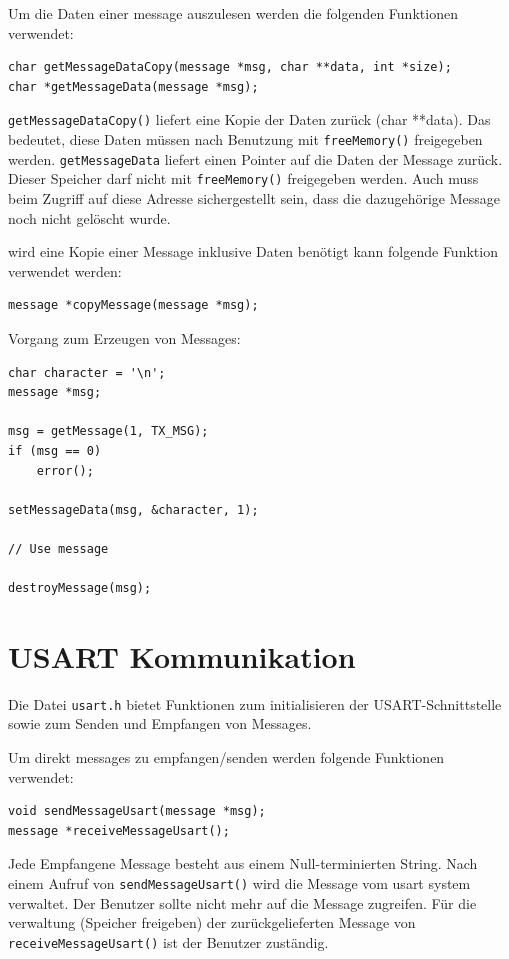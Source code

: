 \documentclass[fontsize=12pt, toc=bibliography, notitlepage]{scrreprt}
\begin{document}
Um die Daten einer message auszulesen werden die folgenden Funktionen verwendet:

\begin{lstlisting}
char getMessageDataCopy(message *msg, char **data, int *size);
char *getMessageData(message *msg);
\end{lstlisting}

\lstinline$getMessageDataCopy()$ liefert eine Kopie der Daten zurück (char **data). Das bedeutet, diese Daten müssen nach Benutzung mit \lstinline$freeMemory()$  freigegeben werden. \lstinline$getMessageData$ liefert einen Pointer auf die Daten der Message zurück. Dieser Speicher darf nicht mit \lstinline$freeMemory()$  freigegeben werden. Auch muss beim Zugriff auf diese Adresse sichergestellt sein, dass die dazugehörige Message noch nicht gelöscht wurde.

wird eine Kopie einer Message inklusive Daten benötigt kann folgende Funktion verwendet werden:

\begin{lstlisting}
message *copyMessage(message *msg);
\end{lstlisting}

Vorgang zum Erzeugen von Messages:

\begin{lstlisting}
char character = '\n';
message *msg;

msg = getMessage(1, TX_MSG);
if (msg == 0)
	error();
	
setMessageData(msg, &character, 1);

// Use message

destroyMessage(msg);
\end{lstlisting}

\section{USART Kommunikation}
\label{subsec:shell-communication}
Die Datei \lstinline$usart.h$ bietet Funktionen zum initialisieren der USART-Schnittstelle sowie zum Senden und Empfangen von Messages.

Um direkt messages zu empfangen/senden werden folgende Funktionen verwendet:

\begin{lstlisting}
void sendMessageUsart(message *msg);
message *receiveMessageUsart();
\end{lstlisting}

Jede Empfangene Message besteht aus einem Null-terminierten String. Nach einem Aufruf von \lstinline$sendMessageUsart()$ wird die Message vom usart system verwaltet. Der Benutzer sollte nicht mehr auf die Message zugreifen. Für die verwaltung (Speicher freigeben) der zurückgelieferten Message von \lstinline$receiveMessageUsart()$ ist der Benutzer zuständig.
\end{document}
